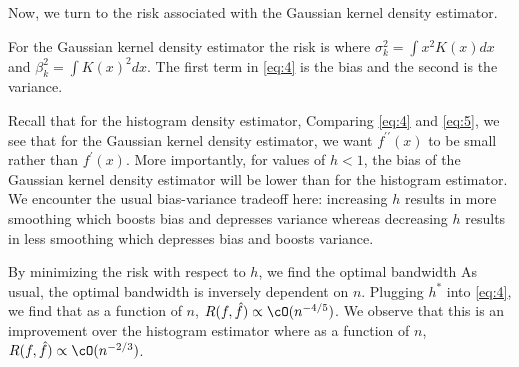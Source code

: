 Now, we turn to the risk associated with the Gaussian kernel density estimator.
\begin{theorem}
For the Gaussian kernel density estimator the risk is 
where $\sigma_k^2 = \int x^2 K(x)dx$ and $\beta_k^2 = \int K(x)^2 dx$. The first term in \eqref{eq:4} is the bias and the second is the variance.
\end{theorem}
Recall that for the histogram density estimator, 
Comparing \eqref{eq:4} and \eqref{eq:5}, we see that for the Gaussian kernel density estimator, we want $f^{\prime \prime}(x)$ to be small rather than $f^{\prime}(x)$. More importantly, for values of $h < 1$, the bias of the Gaussian kernel density estimator will be lower than for the histogram estimator. We encounter the usual bias-variance tradeoff here: increasing $h$ results in more smoothing which boosts bias and depresses variance whereas decreasing $h$ results in less smoothing which depresses bias and boosts variance. 

By minimizing the risk with respect to $h$, we find the optimal bandwidth
As usual, the optimal bandwidth is inversely dependent on $n$. Plugging $h^{*}$ into \eqref{eq:4}, we find that as a function of $n$, $R(f, \hat{f}) \propto \cO(n^{-4/5})$. We observe that this is an improvement over the histogram estimator where as a function of $n$, $R(f, \hat{f}) \propto \cO(n^{-2/3})$. 

